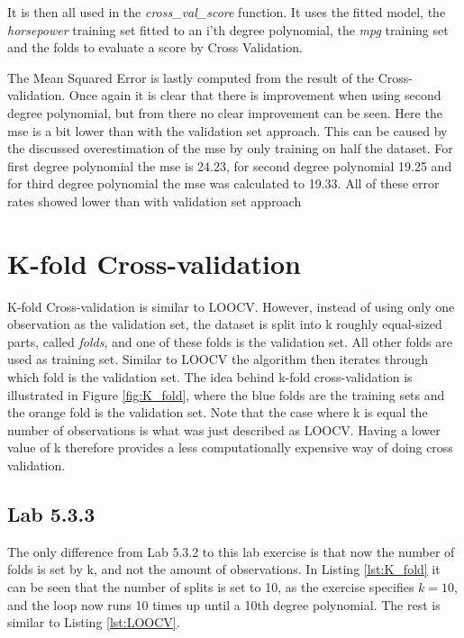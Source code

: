 It is then all used in the \emph{cross\_val\_score} function. It uses the fitted model, the \emph{horsepower} training set fitted to an i'th degree polynomial, the \emph{mpg} training set and the folds to evaluate a score by Cross Validation.



The Mean Squared Error is lastly computed from the result of the Cross-validation. Once again it is clear that there is improvement when using second degree polynomial, but from there no clear improvement can be seen. Here the mse is a bit lower than with the validation set approach. This can be caused by the discussed overestimation of the mse by only training on half the dataset. For first degree polynomial the mse is 24.23, for second degree polynomial 19.25 and for third degree polynomial the mse was calculated to 19.33. All of these error rates showed lower than with validation set approach


\section{K-fold Cross-validation}
K-fold Cross-validation is similar to LOOCV. However, instead of using only one observation as the validation set, the dataset is split into k roughly equal-sized parts, called \emph{folds}, and one of these folds is the validation set. All other folds are used as training set. Similar to LOOCV the algorithm then iterates through which fold is the validation set. The idea behind k-fold cross-validation is illustrated in Figure \ref{fig:K_fold}, where the blue folds are the training sets and the orange fold is the validation set. Note that the case where k is equal the number of observations is what was just described as LOOCV. Having a lower value of k therefore provides a less computationally expensive way of doing cross validation.


\FloatBarrier
\subsection{Lab 5.3.3}
The only difference from Lab 5.3.2 to this lab exercise is that now the number of folds is set by k, and not the amount of observations. In Listing \ref{lst:K_fold} it can be seen that the number of splits is set to 10, as the exercise specifies $k=10$, and the loop now runs 10 times up until a 10th degree polynomial. The rest is similar to Listing \ref{lst:LOOCV}.

